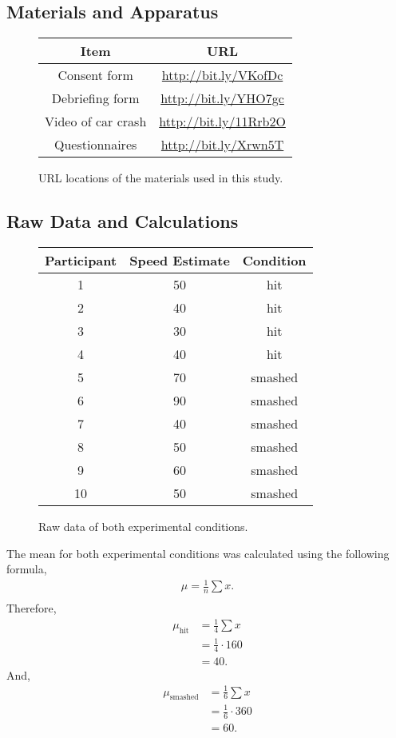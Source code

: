 \documentclass[a4paper,11pt]{report}
\begin{document}
\subsection{Materials and Apparatus}

\begin{figure}[h]
\begin{center}
\begin{tabular}{cc}
\toprule
Item & URL\\
\midrule
Consent form & \url{http://bit.ly/VKofDc}\\
Debriefing form & \url{http://bit.ly/YHO7gc}\\
Video of car crash & \url{http://bit.ly/11Rrb2O}\\
Questionnaires & \url{http://bit.ly/Xrwn5T}\\
\bottomrule
\end{tabular}
\end{center}
\caption{URL locations of the materials used in this study.}
\end{figure}

\subsection{Raw Data and Calculations}

\begin{figure}[h]
\begin{center}
\begin{tabular}{ccc}
\toprule
Participant & Speed Estimate & Condition\\
\midrule
1 & 50 & hit\\
2 & 40 & hit\\
3 & 30 & hit\\
4 & 40 & hit\\
5 & 70 & smashed\\
6 & 90 & smashed\\
7 & 40 & smashed\\
8 & 50 & smashed\\
9 & 60 & smashed\\
10& 50 & smashed\\
\bottomrule
\end{tabular}
\end{center}
\caption{Raw data of both experimental conditions.}
\end{figure}

The mean for both experimental conditions was calculated using the following
formula,
\begin{align*}
    \mu = \frac{1}{n}\sum{x}.\\
\end{align*}
Therefore,
\begin{align*}
    \mu_{\text{hit}} &= \frac{1}{4}\sum{x}\\
    &= \frac{1}{4} \cdot 160\\
    &= 40.
\end{align*}
And,
\begin{align*}
    \mu_{\text{smashed}} &= \frac{1}{6}\sum{x}\\
    &= \frac{1}{6} \cdot 360\\
    &= 60.
\end{align*}
\end{document}

